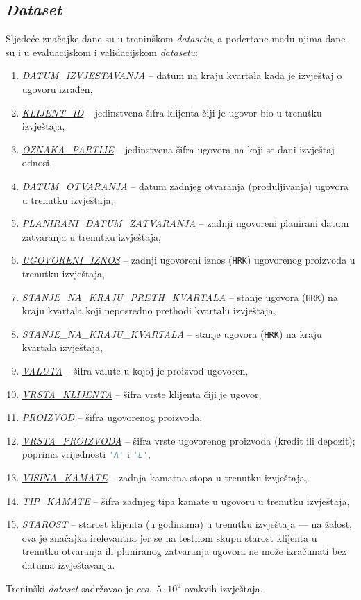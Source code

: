 \documentclass[paper = a4, fontsize = 11pt, DIV = 12, BCOR = 0pt, headings = standardclasses, numbers = endperiod]{scrartcl}
\begin{document}
	\par

	\subsection{\emph{Dataset}}
	\label{sec:dataset}

	Sljedeće značajke dane su u treninškom \emph{datasetu}, a podcrtane među njima dane su i u evaluacijskom i validacijskom \emph{datasetu}:
	\begin{enumerate}
		\item \emph{DATUM\_IZVJESTAVANJA} -- datum na kraju kvartala kada je izvještaj o ugovoru izrađen,
		\item \emph{\underline{KLIJENT\_ID}} -- jedinstvena šifra klijenta čiji je ugovor bio u trenutku izvještaja,
		\item \emph{\underline{OZNAKA\_PARTIJE}} -- jedinstvena šifra ugovora na koji se dani izvještaj odnosi,
		\item \emph{\underline{DATUM\_OTVARANJA}} -- datum zadnjeg otvaranja (produljivanja) ugovora u trenutku izvještaja,
		\item \emph{\underline{PLANIRANI\_DATUM\_ZATVARANJA}} -- zadnji ugovoreni planirani datum zatvaranja u trenutku izvještaja,
		\item \emph{\underline{UGOVORENI\_IZNOS}} -- zadnji ugovoreni iznos (\texttt{HRK}) ugovorenog proizvoda u trenutku izvještaja,
		\item \emph{STANJE\_NA\_KRAJU\_PRETH\_KVARTALA} -- stanje ugovora (\texttt{HRK}) na kraju kvartala koji neposredno prethodi kvartalu izvještaja,
		\item \emph{STANJE\_NA\_KRAJU\_KVARTALA} -- stanje ugovora (\texttt{HRK}) na kraju kvartala izvještaja,
		\item \emph{\underline{VALUTA}} -- šifra valute u kojoj je proizvod ugovoren,
		\item \emph{\underline{VRSTA\_KLIJENTA}} -- šifra vrste klijenta čiji je ugovor,
		\item \emph{\underline{PROIZVOD}} -- šifra ugovorenog proizvoda,
		\item \emph{\underline{VRSTA\_PROIZVODA}} -- šifra vrste ugovorenog proizvoda (kredit ili depozit); poprima vrijednosti \lstinline[language = Python, style = lijepo]{'A'} i \lstinline[language = Python, style = lijepo]{'L'},
		\item \emph{\underline{VISINA\_KAMATE}} -- zadnja kamatna stopa u trenutku izvještaja,
		\item \emph{\underline{TIP\_KAMATE}} -- šifra zadnjeg tipa kamate u ugovoru u trenutku izvještaja,
		\item \emph{\underline{STAROST}} -- starost klijenta (u godinama) u trenutku izvještaja --- na žalost, ova je značajka irelevantna jer se na testnom skupu starost klijenta u trenutku otvaranja ili planiranog zatvaranja ugovora ne može izračunati bez datuma izvještavanja.
	\end{enumerate}
	Treninški \emph{dataset} sadržavao je \emph{cca}.\ $ 5 \cdot 10^{6} $ ovakvih izvještaja.
\end{document}
